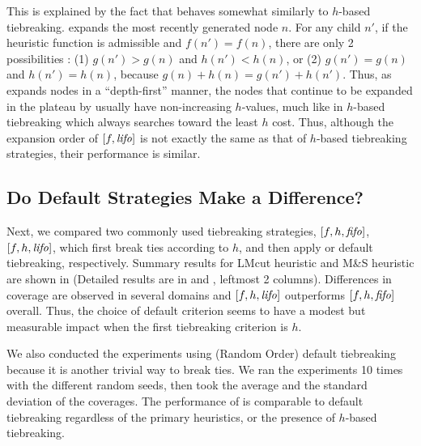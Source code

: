 This is explained by the fact that 
\lifo behaves somewhat similarly to $h$-based tiebreaking.
\lifo expands the most recently generated node $n$.
For any child $n'$, 
if the heuristic function is admissible and $f(n') = f(n)$, there are only 2 possibilities :
(1) $g(n') > g(n)$ and $h(n') < h(n)$, or
(2) $g(n') = g(n)$ and $h(n') = h(n)$,
because $g(n)+h(n)=g(n')+h(n')$.
Thus, as \lifo expands nodes in a ``depth-first'' manner,
the nodes that continue to be expanded in the plateau by \lifo usually   %
have non-increasing $h$-values,
much like in $h$-based tiebreaking which always searches toward the least $h$ cost.
Thus, although the expansion order of $[f,{\text{\textit{lifo}}}]$ is not exactly the same as that of $h$-based tiebreaking strategies,
their performance is similar.



\subsection{Do Default Strategies Make a Difference?}

Next, we  compared two commonly used tiebreaking strategies, $[f,h,{\text{\textit{fifo}}}]$, $[f,h,{\text{\textit{lifo}}}]$, which
first break ties according to $h$, and then apply \fifo or \lifo
default tiebreaking, respectively.
Summary results for LMcut heuristic \cite{Helmert2009} and M\&S heuristic \cite{HelmertHHN14} are
shown in  (Detailed results are in  and , leftmost 2 columns).
Differences in coverage are observed in several domains and $[f,h,{\text{\textit{lifo}}}]$ outperforms $[f,h,{\text{\textit{fifo}}}]$ overall. Thus, the choice of default criterion seems to have a modest but measurable impact when the first tiebreaking criterion is $h$.

We also conducted the experiments using \ro (Random Order) default tiebreaking because it is another trivial way to
break ties. We ran the experiments 10 times with the different random seeds, then took the average and the
standard deviation of the coverages. The performance of \ro is comparable to \fifo default tiebreaking regardless
of the primary heuristics, or the presence of $h$-based tiebreaking.

